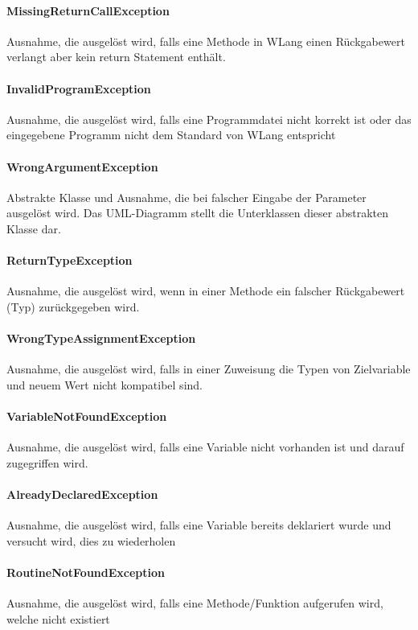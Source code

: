 \documentclass[parskip=full]{scrartcl}
\begin{document}
\paragraph{MissingReturnCallException}
Ausnahme, die ausgelöst wird, falls eine Methode in WLang einen Rückgabewert verlangt aber kein return Statement enthält.
\paragraph{InvalidProgramException}
Ausnahme, die ausgelöst wird, falls eine Programmdatei nicht korrekt ist oder das eingegebene Programm nicht dem Standard von WLang entspricht
\paragraph{WrongArgumentException}
Abstrakte Klasse und Ausnahme, die bei falscher Eingabe der Parameter ausgelöst wird. Das UML-Diagramm stellt die Unterklassen dieser abstrakten Klasse dar.
\paragraph{ReturnTypeException}
Ausnahme, die ausgelöst wird, wenn in einer Methode ein falscher Rückgabewert (Typ) zurückgegeben wird.
\paragraph{WrongTypeAssignmentException}
Ausnahme, die ausgelöst wird, falls in einer Zuweisung die Typen von Zielvariable und neuem Wert nicht kompatibel sind.
\paragraph{VariableNotFoundException}
Ausnahme, die ausgelöst wird, falls eine Variable nicht vorhanden ist und darauf zugegriffen wird.
\paragraph{AlreadyDeclaredException}
Ausnahme, die ausgelöst wird, falls eine Variable bereits deklariert wurde und versucht wird, dies zu wiederholen
\paragraph{RoutineNotFoundException}
Ausnahme, die ausgelöst wird, falls eine Methode/Funktion aufgerufen wird, welche nicht existiert


\newpage
\end{document}
